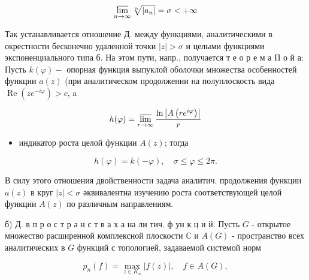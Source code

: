 \documentclass[10pt]{article}
\begin{document}
\[

\varlimsup_{n \rightarrow \infty} \sqrt[n]{\left|a_{n}\right|}=\sigma<+\infty

\]



Так устанавливается отношение Д. между функциями, аналитическими в окрестности бесконечно удаленной точки $|z|>\sigma$ и целыми функциями экспоненциального типа б. На этом пути, напр., получается т е о р е м а П о й а: Пусть $k(\varphi)-$ опорная функция выпуклой оболочки множества особенностей функции $a(z)$ (при аналитическом продолжении на полуплоскость вида $\operatorname{Re}\left(z e^{-i \varphi}\right)>c$, a



\[

h(\varphi)=\varlimsup_{r \rightarrow \infty} \frac{\ln \left|A\left(r e^{i \varphi}\right)\right|}{r}

\]



\begin{itemize}

  \item индикатор роста целой функции $A(z)$; тогда

\end{itemize}



\[

h(\varphi)=k(-\varphi), \quad \sigma \leqslant \varphi \leqslant 2 \pi .

\]



В силу этого отношения двойственности задача аналитич. продолжения функции $a(z)$ в круг $|z|<\sigma$ әквивалентна изучению роста соответствующей целой функции $A(z)$ по различным направлениям.



б) Д. в п р о с т р а н с т в а х а на ли тич. ф ун к ц и й. Пусть $G$ - открытое множество расширенной комплексной плоскости $\mathbb{C}$ и $A(G)$ - пространство всех аналитических в $G$ функций с топологией, задаваемой системой норм



\[

p_{n}(f)=\max _{z \in K_{n}}|f(z)|, \quad f \in A(G),

\]
\end{document}
